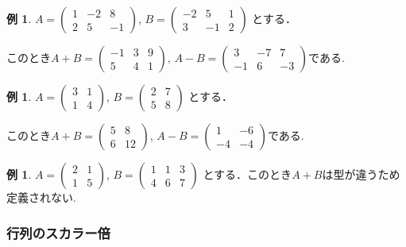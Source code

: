 \documentclass[dvipdfmx,a4paper,11pt]{article}
\theoremstyle{definition}
\newtheorem{exa}[thm]{例}
\begin{document}
 \begin{exa}
 $A = 
 \begin{pmatrix}
 1 &-2&8 \\
 2&5&-1
 \end{pmatrix}
 $, 
 $
 B = 
 \begin{pmatrix}
 -2&5&1 \\
 3&-1&2
 \end{pmatrix}
 $
 とする．
 
 このとき$
 A+B =
 \begin{pmatrix}
 -1 &3&9 \\
 5&4&1
 \end{pmatrix}
 $, 
 $
  A-B =
 \begin{pmatrix}
 3 &-7&7 \\
 -1&6&-3
 \end{pmatrix}
 $である.
 \end{exa}

\begin{exa}
 $A = 
 \begin{pmatrix}
 3&1 \\
 1&4
 \end{pmatrix}
 $, 
 $
 B = 
 \begin{pmatrix}
 2&7\\
 5&8
 \end{pmatrix}
 $
 とする．
 
 このとき$
 A+B =
 \begin{pmatrix}
 5&8 \\
6&12
 \end{pmatrix}
 $, 
 $
  A-B =
 \begin{pmatrix}
 1&-6 \\
 -4&-4
 \end{pmatrix}
 $である.
 \end{exa}
 
 \begin{exa}
 $A = 
 \begin{pmatrix}
 2&1 \\
 1&5
 \end{pmatrix}
 $,
$ 
 B = 
 \begin{pmatrix}
 1&1 &3 \\
 4&6 & 7
 \end{pmatrix}
 $
 とする．このとき$A+B$は型が違うため定義されない. 
 \end{exa}
 
 

 \subsubsection{行列のスカラー倍}
 
\end{document}
